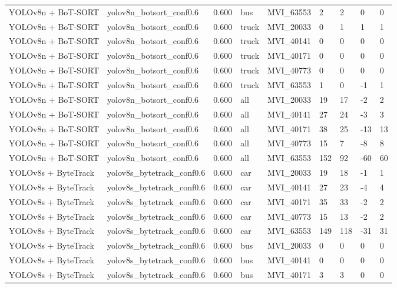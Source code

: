 \begin{tabular}{lllllllll}
YOLOv8n + BoT-SORT & yolov8n\_botsort\_conf0.6 & 0.600 & bus & MVI\_63553 & 2 & 2 & 0 & 0 \\
YOLOv8n + BoT-SORT & yolov8n\_botsort\_conf0.6 & 0.600 & truck & MVI\_20033 & 0 & 1 & 1 & 1 \\
YOLOv8n + BoT-SORT & yolov8n\_botsort\_conf0.6 & 0.600 & truck & MVI\_40141 & 0 & 0 & 0 & 0 \\
YOLOv8n + BoT-SORT & yolov8n\_botsort\_conf0.6 & 0.600 & truck & MVI\_40171 & 0 & 0 & 0 & 0 \\
YOLOv8n + BoT-SORT & yolov8n\_botsort\_conf0.6 & 0.600 & truck & MVI\_40773 & 0 & 0 & 0 & 0 \\
YOLOv8n + BoT-SORT & yolov8n\_botsort\_conf0.6 & 0.600 & truck & MVI\_63553 & 1 & 0 & -1 & 1 \\
YOLOv8n + BoT-SORT & yolov8n\_botsort\_conf0.6 & 0.600 & all & MVI\_20033 & 19 & 17 & -2 & 2 \\
YOLOv8n + BoT-SORT & yolov8n\_botsort\_conf0.6 & 0.600 & all & MVI\_40141 & 27 & 24 & -3 & 3 \\
YOLOv8n + BoT-SORT & yolov8n\_botsort\_conf0.6 & 0.600 & all & MVI\_40171 & 38 & 25 & -13 & 13 \\
YOLOv8n + BoT-SORT & yolov8n\_botsort\_conf0.6 & 0.600 & all & MVI\_40773 & 15 & 7 & -8 & 8 \\
YOLOv8n + BoT-SORT & yolov8n\_botsort\_conf0.6 & 0.600 & all & MVI\_63553 & 152 & 92 & -60 & 60 \\
YOLOv8s + ByteTrack & yolov8s\_bytetrack\_conf0.6 & 0.600 & car & MVI\_20033 & 19 & 18 & -1 & 1 \\
YOLOv8s + ByteTrack & yolov8s\_bytetrack\_conf0.6 & 0.600 & car & MVI\_40141 & 27 & 23 & -4 & 4 \\
YOLOv8s + ByteTrack & yolov8s\_bytetrack\_conf0.6 & 0.600 & car & MVI\_40171 & 35 & 33 & -2 & 2 \\
YOLOv8s + ByteTrack & yolov8s\_bytetrack\_conf0.6 & 0.600 & car & MVI\_40773 & 15 & 13 & -2 & 2 \\
YOLOv8s + ByteTrack & yolov8s\_bytetrack\_conf0.6 & 0.600 & car & MVI\_63553 & 149 & 118 & -31 & 31 \\
YOLOv8s + ByteTrack & yolov8s\_bytetrack\_conf0.6 & 0.600 & bus & MVI\_20033 & 0 & 0 & 0 & 0 \\
YOLOv8s + ByteTrack & yolov8s\_bytetrack\_conf0.6 & 0.600 & bus & MVI\_40141 & 0 & 0 & 0 & 0 \\
YOLOv8s + ByteTrack & yolov8s\_bytetrack\_conf0.6 & 0.600 & bus & MVI\_40171 & 3 & 3 & 0 & 0 \\

\end{tabular}
